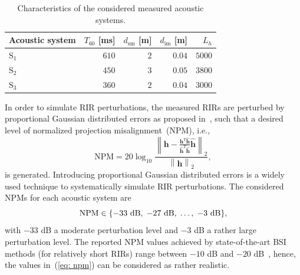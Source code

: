 \documentclass[10pt]{IEEEtran}
\begin{document}
\begin{table}[t!]
\begin{center}
  \caption{Characteristics of the considered measured acoustic systems.}
  \label{tbl: ac_sys}
  \begin{tabularx}{\linewidth}{Xrrrr}
    \toprule
    Acoustic system & $T_{60}$ [ms] & $d_{\text{sm}}$ [m] & $d_{\text{im}}$ [m] & $L_h$  \\
    \midrule
    $\text{S}_1$ & $610$ & $2$ & $0.04$ & $5000$ \\
    $\text{S}_2$ & $450$ & $3$ & $0.05$ & $3800$ \\
    $\text{S}_3$ & $360$ & $2$ & $0.04$ & $3000$ \\
    \bottomrule
  \end{tabularx}
\end{center}
\end{table}
In order to simulate RIR perturbations, the measured RIRs are perturbed by proportional Gaussian distributed errors as proposed in~\cite{Zhang_HINDAWI_2008}, such that a desired level of normalized projection misalignment~(NPM), i.e.,
\begin{equation}
{\text{NPM}} = 20 \log_{10} \frac{ \left\| \mathbf{h} - \frac{\mathbf{h}^T\hat{\mathbf{h}}}{\hat{\mathbf{h}}^T\hat{\mathbf{h}}}\hat{\mathbf{h}}\right\|_2}{\left\| \mathbf{h} \right\|_2},
\end{equation}
is generated.
Introducing proportional Gaussian distributed errors is a widely used technique to systematically simulate RIR perturbations.
The considered NPMs for each acoustic system are
\begin{equation}
\label{eq: npm}
{\text{NPM}} \in \{ -33~{\rm dB}, \; -27~{\rm dB}, \; \ldots, \; -3~{\rm dB} \},
\end{equation}
with $-33$ dB a moderate perturbation level and $-3$ dB a rather large perturbation level.
The reported NPM values achieved by state-of-the-art BSI methods (for relatively short RIRs) range between $-10$ dB and $-20$ dB~\cite{Hu_EUSIPCO_2015}, hence, the values in~(\ref{eq: npm}) can be considered as rather realistic.
\end{document}
